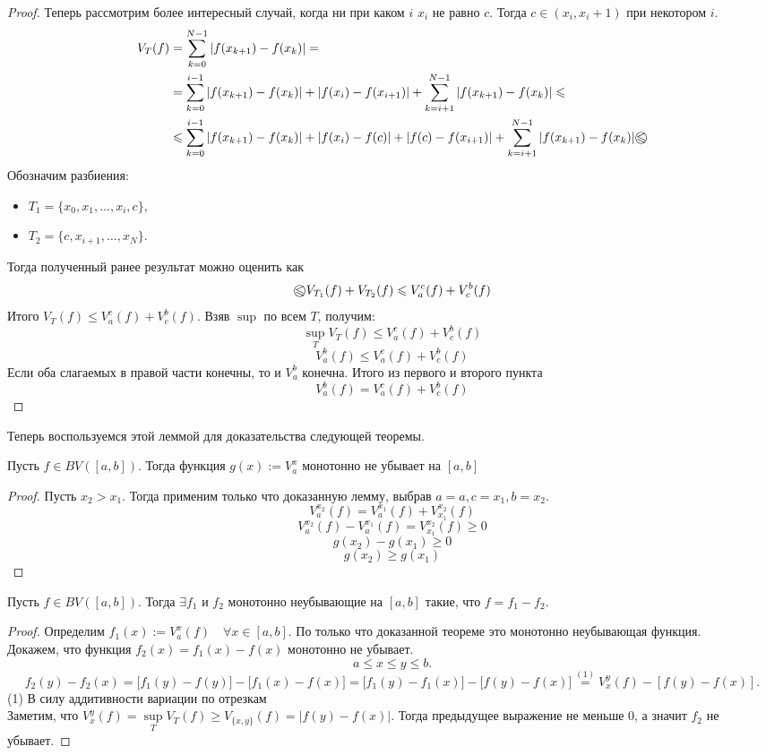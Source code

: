 \begin{proof}
    Теперь рассмотрим более интересный случай, когда ни при каком $i$ $x_i$ не равно $c$. Тогда $c \in (x_i, x_i + 1)$ при некотором $i$.
    \[\begin{aligned}
        V_T(f)
        & = \sum_{k=0}^{N - 1} | f(x_{k+1}) - f(x_k) | = \\
        & =
        \sum_{k=0}^{i - 1} |f(x_{k+1}) - f(x_k)| + |f(x_i) - f(x_{i+1})| +
        \sum_{k=i+1}^{N-1} |f(x_{k+1}) - f(x_k)| \leq \\
        & \leq
        \sum_{k=0}^{i - 1} |f(x_{k+1}) - f(x_k)| + |f(x_i) - f(c)| + |f(c) - f(x_{i+1})| +
        \sum_{k=i+1}^{N-1} |f(x_{k+1}) - f(x_k)|
        \incirc{\leq}
    \end{aligned}\]
    Обозначим разбиения:
    \begin{itemize}
        \item $T_1 = \{x_0, x_1, \dots, x_i, c\}$,
        \item $T_2 = \{c, x_{i+1}, \dots, x_N\}$.
    \end{itemize}
    Тогда полученный ранее результат можно оценить как
    \[
        \incirc{\leq} V_{T_1}(f) + V_{T_2}(f) \leq V_a^c(f) + V_c^b(f)
    \]
    Итого $V_T(f) \leq V_a^c(f) + V_c^b(f)$. Взяв $\sup$ по всем $T$, получим: \[
        \sup_T V_T(f) \leq V_a^c(f) + V_c^b(f)
    \]\[
        V_a^b(f) \leq V_a^c(f) + V_c^b(f)
    \]
    Если оба слагаемых в правой части конечны, то и $V_a^b$ конечна. Итого из первого и второго пункта \[
		V_a^b(f) = V_a^c(f) + V_c^b(f)
	\]
\end{proof}
Теперь воспользуемся этой леммой для доказательства следующей теоремы.
\begin{theorem}
	Пусть $f \in BV([a, b])$. Тогда функция $g(x) := V_a^x$ монотонно не убывает на $[a, b]$
\end{theorem}
\begin{proof}
	Пусть $x_2 > x_1$. Тогда применим только что доказанную лемму, выбрав $a = a, c = x_1, b = x_2$. \[
		V_a^{x_2} (f) = V_a^{x_1} (f) + V_{x_1}^{x_2} (f)
	\]\[
		V_a^{x_2} (f) - V_a^{x_1} (f) = V_{x_1}^{x_2}(f) \geq 0
	\]\[
		g(x_2) - g(x_1) \geq 0
	\]\[
		g(x_2) \geq g(x_1)
	\]
\end{proof}
\begin{theorem}
	Пусть $f \in BV([a, b])$. Тогда $\exists f_1$ и $f_2$ монотонно неубывающие на $[a, b]$ такие, что $f = f_1 - f_2$.
\end{theorem}
\begin{proof}
	Определим $f_1(x) := V_a^x(f) \quad \forall x \in [a,b]$. По только что доказанной теореме это монотонно неубывающая функция.\\
    	Докажем, что функция $f_2(x) = f_1(x) - f(x)$ монотонно не убывает.\[
		a \leq x \leq y \leq b.
	\]\[
		f_2(y) - f_2(x) = \bigg[f_1(y) - f(y)\bigg] - \bigg[f_1(x) - f(x)\bigg] = \bigg[f_1(y) - f_1(x)\bigg] - \bigg[f(y) - f(x)\bigg]
		\stackrel{(1)}{=} 
		V_x^y(f) - [f(y) - f(x)].
	\]
	(1) В силу аддитивности вариации по отрезкам\\
	Заметим, что $V_x^y(f) = \sup\limits_T V_T(f) \geq V_{\{x, y\}}(f) = |f(y) - f(x)|$. Тогда предыдущее выражение не меньше 0, а значит $f_2$ не убывает.
\end{proof}
